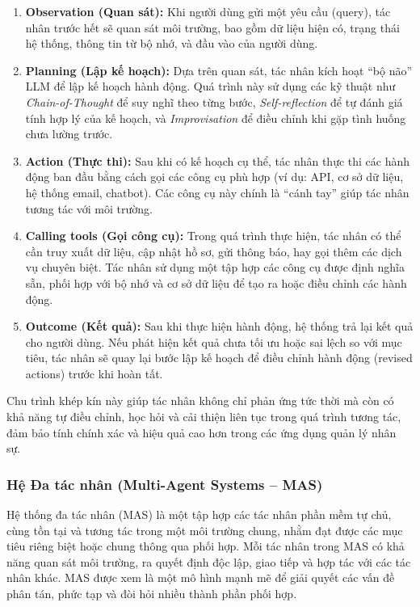 \documentclass{article}
\begin{document}
\begin{enumerate}[topsep=0pt, itemsep=2pt, leftmargin=40pt, label=\arabic*.]
    \item \textbf{Observation (Quan sát):} Khi người dùng gửi một yêu cầu (query), tác nhân trước hết sẽ quan sát môi trường, bao gồm dữ liệu hiện có, trạng thái hệ thống, thông tin từ bộ nhớ, và đầu vào của người dùng.
    \item \textbf{Planning (Lập kế hoạch):} Dựa trên quan sát, tác nhân kích hoạt “bộ não” LLM để lập kế hoạch hành động. Quá trình này sử dụng các kỹ thuật như \textit{Chain-of-Thought} để suy nghĩ theo từng bước, \textit{Self-reflection} để tự đánh giá tính hợp lý của kế hoạch, và \textit{Improvisation} để điều chỉnh khi gặp tình huống chưa lường trước.
    \item \textbf{Action (Thực thi):} Sau khi có kế hoạch cụ thể, tác nhân thực thi các hành động ban đầu bằng cách gọi các công cụ phù hợp (ví dụ: API, cơ sở dữ liệu, hệ thống email, chatbot). Các công cụ này chính là “cánh tay” giúp tác nhân tương tác với môi trường.
    \item \textbf{Calling tools (Gọi công cụ):} Trong quá trình thực hiện, tác nhân có thể cần truy xuất dữ liệu, cập nhật hồ sơ, gửi thông báo, hay gọi thêm các dịch vụ chuyên biệt. Tác nhân sử dụng một tập hợp các công cụ được định nghĩa sẵn, phối hợp với bộ nhớ và cơ sở dữ liệu để tạo ra hoặc điều chỉnh các hành động.
    \item \textbf{Outcome (Kết quả):} Sau khi thực hiện hành động, hệ thống trả lại kết quả cho người dùng. Nếu phát hiện kết quả chưa tối ưu hoặc sai lệch so với mục tiêu, tác nhân sẽ quay lại bước lập kế hoạch để điều chỉnh hành động (revised actions) trước khi hoàn tất.
\end{enumerate}


Chu trình khép kín này giúp tác nhân không chỉ phản ứng tức thời mà còn có khả năng tự điều chỉnh, học hỏi và cải thiện liên tục trong quá trình tương tác, đảm bảo tính chính xác và hiệu quả cao hơn trong các ứng dụng quản lý nhân sự.

\subsubsection{Hệ Đa tác nhân (Multi-Agent Systems – MAS)}

Hệ thống đa tác nhân (MAS) là một tập hợp các tác nhân phần mềm tự chủ, cùng tồn tại và tương tác trong một môi trường chung, nhằm đạt được các mục tiêu riêng biệt hoặc chung thông qua phối hợp. Mỗi tác nhân trong MAS có khả năng quan sát môi trường, ra quyết định độc lập, giao tiếp và hợp tác với các tác nhân khác. MAS được xem là một mô hình mạnh mẽ để giải quyết các vấn đề phân tán, phức tạp và đòi hỏi nhiều thành phần phối hợp.
\end{document}
